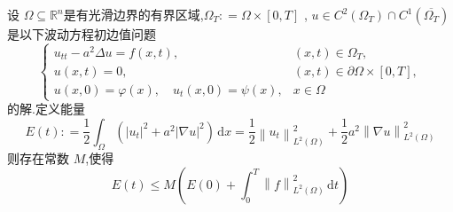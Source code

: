 \documentclass[../../main.tex]{subfiles}
\begin{document}
\begin{theorem}
    设 \(   \Omega \subseteq \mathbb{R} ^{n}  \)是有光滑边界的有界区域,\(   \Omega _{T}: =   \Omega \times \left[ 0,T \right]   \) ,  \(  u\in C^{2}\left(  \Omega _{T} \right)\cap C^{1}\left( \overline{ \Omega _{T}} \right)    \)  是以下波动方程初边值问题 \[
    \begin{cases} u_{tt}-a^{2} \Delta u= f\left( x,t \right),&\left( x,t \right)\in  \Omega _{T},\\ 
     u\left( x,t \right)= 0,&\left( x,t \right)\in  \partial  \Omega \times \left[ 0,T \right],\\ 
      u\left( x,0 \right)=  \varphi \left( x \right),\quad u_{t}\left( x,0 \right)= \psi \left( x \right),&x\in  \Omega           \end{cases} 
    \]的解.定义能量 \[
    E\left( t \right): =   \frac{1}{2} \int_{ \Omega } \left( \left|u_{t} \right|^{2}+a^{2} \left|   \nabla u \right|^{2}   \right)\,\mathrm{d} x = \frac{1}{2}\left\| u_{t} \right\|_{L^{2}\left(  \Omega  \right) }^{2}+ \frac{1}{2}a^{2} \left\|  \nabla  u \right\|^{2}_{L^{2}\left(  \Omega  \right) }  
    \]则存在常数 \(  M  \),使得 \[
    E\left( t \right) \le M\left( E\left( 0 \right)+  \int_{0}^{T}\left\| f \right\|^{2}_{ L ^{2}\left(  \Omega  \right) }\,\mathrm{d} t  \right) 
    \] 
\end{theorem}
\end{document}
